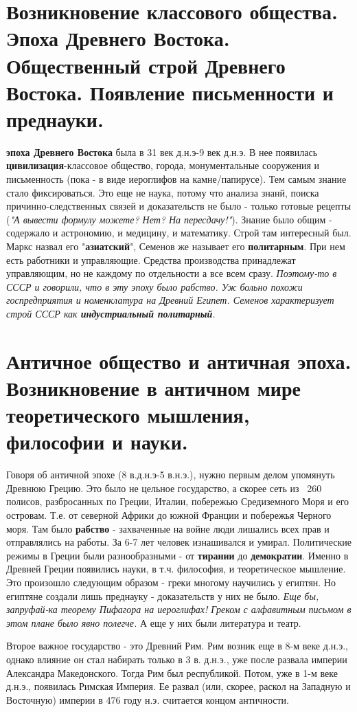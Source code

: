 \documentclass[12pt,a4paper]{article}
\begin{document}
\section{Возникновение классового общества. Эпоха Древнего Востока. Общественный строй Древнего Востока. Появление письменности и преднауки.}
\textbf{эпоха Древнего Востока} была в 31 век д.н.э-9 век д.н.э. В нее появилась \textbf{цивилизация}-классовое общество, города, монументальные сооружения и письменность (пока - в виде иероглифов на камне/папирусе). Тем самым знание стало фиксироваться. Это еще не наука, потому что анализа знанй, поиска причинно-следственных связей и доказательств не было - только готовые рецепты (\textit{"А вывести формулу можете? Нет? На пересдачу!"}). Знание было общим - содержало и астрономию, и медицину, и математику. Строй там интересный был. Маркс назвал его "\textbf{азиатский}", Семенов же называет его \textbf{политарным}. При нем есть работники и управляющие. Средства производства принадлежат управляющим, но не каждому по отдельности а все всем сразу. \textit{Поэтому-то в СССР и говорили, что в эту эпоху было рабство. Уж больно похожи госпредприятия и номенклатура на Древний Египет. Семенов характеризует строй СССР как \textbf{индустриальный политарный}.}

\section{Античное общество и античная эпоха. Возникновение в античном мире теоретического мышления, философии и науки.}
Говоря об античной эпохе (8 в.д.н.э-5 в.н.э.), нужно первым делом упомянуть Древнюю Грецию. Это было не цельное государство, а скорее сеть из ~260 полисов, разбросанных по Греции, Италии, побережью Средиземного Моря и его островам. Т.е. от северной Африки до южной Франции и побережья Черного моря. Там было \textbf{рабство} - захваченные на войне люди лишались всех прав и отправлялись на работы. За 6-7 лет человек изнашивался и умирал.  Политические режимы в Греции были разнообразными - от \textbf{тирании} до \textbf{демократии}. Именно в Древней Греции появились науки, в т.ч. философия, и теоретическое мышление. Это произошло следующим образом - греки многому научились у египтян. Но египтяне создали лишь преднауку  - доказательств у них не было. \textit{Еще бы, запруфай-ка теорему Пифагора на иероглифах! Греком с алфавитным письмом  в этом плане было явно полегче.} А еще у них были литература и театр.

Второе важное государство - это Древний Рим. Рим возник еще в 8-м веке д.н.э., однако влияние он стал набирать только в 3 в. д.н.э., уже после развала империи Александра Македонского. Тогда Рим был республикой. Потом, уже в 1-м веке д.н.э., появилась Римская Империя. Ее развал (или, скорее, раскол на Западную и Восточную) империи в 476 году н.э. считается концом античности.
\end{document}
